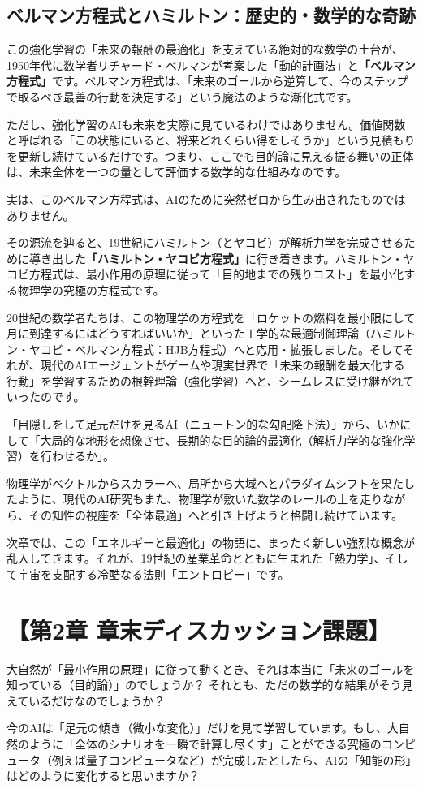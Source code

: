 \subsection{ベルマン方程式とハミルトン：歴史的・数学的な奇跡}

この強化学習の「未来の報酬の最適化」を支えている絶対的な数学の土台が、1950年代に数学者リチャード・ベルマンが考案した「動的計画法」と\textbf{「ベルマン方程式」}です。ベルマン方程式は、「未来のゴールから逆算して、今のステップで取るべき最善の行動を決定する」という魔法のような漸化式です。

ただし、強化学習のAIも未来を実際に見ているわけではありません。価値関数と呼ばれる「この状態にいると、将来どれくらい得をしそうか」という見積もりを更新し続けているだけです。つまり、ここでも目的論に見える振る舞いの正体は、未来全体を一つの量として評価する数学的な仕組みなのです。

実は、このベルマン方程式は、AIのために突然ゼロから生み出されたものではありません。

その源流を辿ると、19世紀にハミルトン（とヤコビ）が解析力学を完成させるために導き出した\textbf{「ハミルトン・ヤコビ方程式」}に行き着きます。ハミルトン・ヤコビ方程式は、最小作用の原理に従って「目的地までの残りコスト」を最小化する物理学の究極の方程式です。

20世紀の数学者たちは、この物理学の方程式を「ロケットの燃料を最小限にして月に到達するにはどうすればいいか」といった工学的な最適制御理論（ハミルトン・ヤコビ・ベルマン方程式：HJB方程式）へと応用・拡張しました。そしてそれが、現代のAIエージェントがゲームや現実世界で「未来の報酬を最大化する行動」を学習するための根幹理論（強化学習）へと、シームレスに受け継がれていったのです。

「目隠しをして足元だけを見るAI（ニュートン的な勾配降下法）」から、いかにして「大局的な地形を想像させ、長期的な目的論的最適化（解析力学的な強化学習）を行わせるか」。

物理学がベクトルからスカラーへ、局所から大域へとパラダイムシフトを果たしたように、現代のAI研究もまた、物理学が敷いた数学のレールの上を走りながら、その知性の視座を「全体最適」へと引き上げようと格闘し続けています。

次章では、この「エネルギーと最適化」の物語に、まったく新しい強烈な概念が乱入してきます。それが、19世紀の産業革命とともに生まれた「熱力学」、そして宇宙を支配する冷酷なる法則「エントロピー」です。

\section*{【第2章 章末ディスカッション課題】}

大自然が「最小作用の原理」に従って動くとき、それは本当に「未来のゴールを知っている（目的論）」のでしょうか？ それとも、ただの数学的な結果がそう見えているだけなのでしょうか？

今のAIは「足元の傾き（微小な変化）」だけを見て学習しています。もし、大自然のように「全体のシナリオを一瞬で計算し尽くす」ことができる究極のコンピュータ（例えば量子コンピュータなど）が完成したとしたら、AIの「知能の形」はどのように変化すると思いますか？




